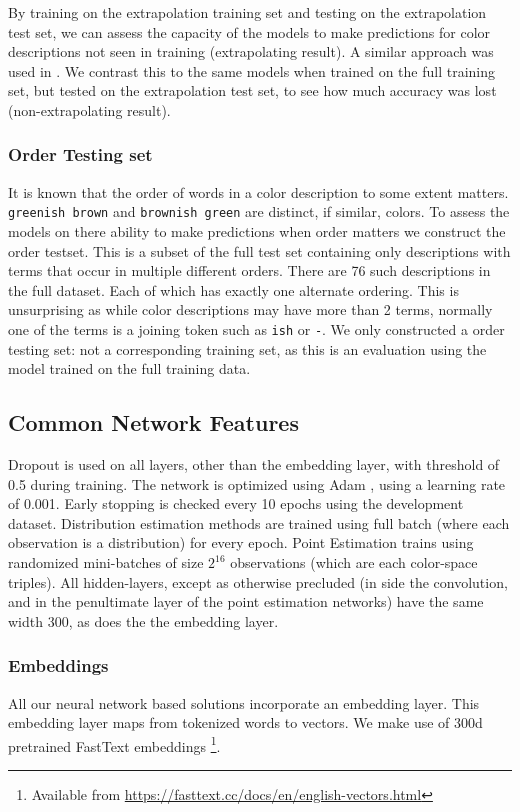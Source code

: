 \documentclass[11pt,a4paper]{article}
\newcommand{\parencite}{\citep}
\newcommand{\textcite}{\citet}
\newcommand{\natlang}[1]{\texttt{#1}}
\begin{document}
By training on the extrapolation training set and testing on the extrapolation test set, we can assess the capacity of the models to make predictions for color descriptions not seen in training (extrapolating result).
A similar approach was used in \textcite{DBLP:journals/corr/AtzmonBKGC16}.
We contrast this to the same models when trained on the full training set, but tested on the extrapolation test set, to see how much accuracy was lost (non-extrapolating result).


\subsubsection{Order Testing set}
It is known that the order of words in a color description to some extent matters.
\natlang{greenish brown} and \natlang{brownish green} are distinct, if similar, colors.
To assess the models on there ability to make predictions when order matters we construct the order testset.
This is a subset of the full test set containing only descriptions with terms that occur in multiple different orders.
There are 76 such descriptions in the full dataset.
Each of which has exactly one alternate ordering.
This is unsurprising as while color descriptions may have more than 2 terms, normally one of the terms is a joining token such as \natlang{ish} or \natlang{-}.
We only constructed a order testing set: not a corresponding training set, as this is an evaluation using the model trained on the full training data.



\subsection{Common Network Features}
Dropout\parencite{srivastava2014dropout}  is used on all layers, other than the embedding layer, with threshold of 0.5 during training.
The network is optimized using Adam
\cite{kingma2014adam}, using a learning rate of 0.001.
Early stopping is checked every 10 epochs using the development dataset.
Distribution estimation methods are trained using full batch (where each observation is a distribution) for every epoch.
Point Estimation trains using randomized mini-batches of size $2^16$ observations (which are each color-space triples).
All hidden-layers, except as otherwise precluded (in side the convolution, and in the penultimate layer of the point estimation networks) have the same width 300, as does the the embedding layer.


\subsubsection{Embeddings}\label{sec:embeddings} 
All our neural network based solutions incorporate an embedding layer.
This embedding layer maps from tokenized words to vectors.
We make use of 300d pretrained FastText embeddings \textcite{bojanowski2016enriching}\footnote{Available from \url{https://fasttext.cc/docs/en/english-vectors.html}}.
\end{document}
